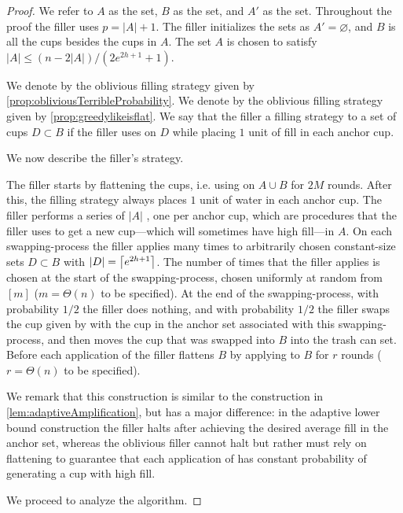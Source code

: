 \begin{proof}
  We refer to $A$ as the  set, $B$ as the
   set, and $A'$ as the  set.
  Throughout the proof the filler uses $p=|A|+1$.
  The filler initializes the sets as $A' = \varnothing$, and $B$
  is all the cups besides the cups in $A$.
  The set $A$ is chosen to satisfy $|A| \le (n - 2|A|) / (2e^{2h+1} + 1)$.

We denote by \randalg the oblivious filling
strategy given by \cref{prop:obliviousTerribleProbability}. 
We denote by \flatalg the oblivious filling
strategy given by \cref{prop:greedylikeisflat}.
We say that the filler  a filling strategy
\genericalg to a set of cups $D \subset B$ if the filler uses
\genericalg on $D$ while placing $1$ unit of fill in each anchor cup. 

We now describe the filler's strategy.

The filler starts by flattening the cups, i.e. using \flatalg on
$A\cup B$ for $2M$ rounds. After this, the filling strategy
always places $1$ unit of water in each anchor cup. The filler
performs a series of $|A|$ , one per
anchor cup, which are procedures that the filler uses to get a
new cup---which will sometimes have high fill---in $A$. On each
swapping-process the filler applies \randalg many times to
arbitrarily chosen constant-size sets $D \subset B$ with $|D| =
\left\lceil e^{2h+1} \right\rceil$. The number of times that the filler applies
\randalg is chosen at the start of the swapping-process, chosen
uniformly at random from $[m]$ ($m = \Theta(n)$ to be
specified). At the end of the swapping-process, with probability
$1/2$ the filler does nothing, and with probability $1/2$ the filler swaps
the cup given by \randalg with the cup in the anchor set
associated with this swapping-process, and then moves the cup
that was swapped into $B$ into the trash can set. Before each application of
\randalg the filler flattens $B$ by applying \flatalg to $B$ for
$r$ rounds ($r=\Theta(n)$ to be specified). 

We remark that this construction is similar to
the construction in \cref{lem:adaptiveAmplification}, but has a
major difference: in the adaptive lower bound construction the
filler halts after achieving the desired average fill in the
anchor set, whereas the oblivious filler cannot halt but rather
must rely on flattening to guarantee that each application of
\randalg has constant probability of generating a cup with high fill.

We proceed to analyze the algorithm.


\end{proof}
